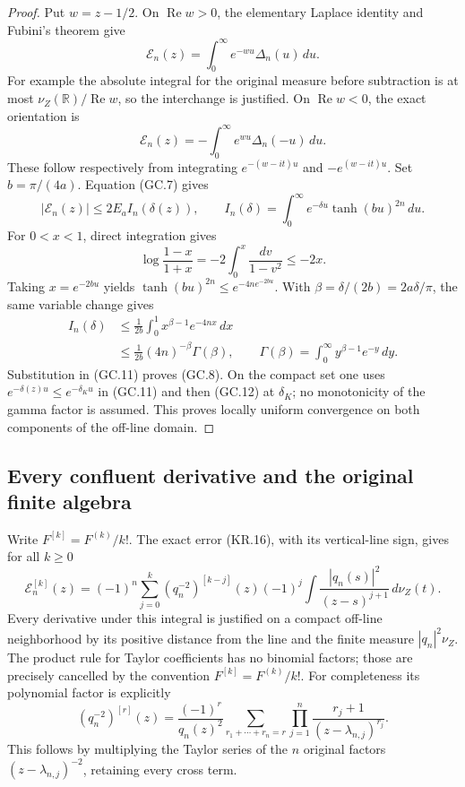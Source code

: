 \begin{proof}
Put \(w=z-1/2\).  On \(\operatorname{Re}w>0\), the elementary
Laplace identity and Fubini's theorem give
\[
 \mathcal E_n(z)=\int_0^\infty e^{-wu}\Delta_n(u)\,du.
                                                        \tag{GC.9}
\]
For example the absolute integral for the original measure before
subtraction is at most \(\nu_Z(\mathbb R)/\operatorname{Re}w\),
so the interchange is justified.  On \(\operatorname{Re}w<0\),
the exact orientation is
\[
 \mathcal E_n(z)=-\int_0^\infty e^{wu}\Delta_n(-u)\,du.
                                                        \tag{GC.10}
\]
These follow respectively from integrating \(e^{-(w-it)u}\) and
\(-e^{(w-it)u}\).  Set \(b=\pi/(4a)\).  Equation (GC.7) gives
\[
 |\mathcal E_n(z)|\leq2E_a I_n(\delta(z)),\qquad
 I_n(\delta)=\int_0^\infty e^{-\delta u}\tanh(bu)^{2n}\,du.
                                                        \tag{GC.11}
\]
For \(0<x<1\), direct integration gives
\[
 \log\frac{1-x}{1+x}=-2\int_0^x\frac{dv}{1-v^2}\leq-2x.
\]
Taking \(x=e^{-2bu}\) yields
\(\tanh(bu)^{2n}\leq e^{-4ne^{-2bu}}\).  With
\(\beta=\delta/(2b)=2a\delta/\pi\), the same variable change gives
\[
 \begin{split}
 I_n(\delta)
 &\leq\frac1{2b}\int_0^1x^{\beta-1}e^{-4nx}\,dx\\
 &\leq\frac1{2b}(4n)^{-\beta}\Gamma(\beta),\qquad
 \Gamma(\beta)=\int_0^\infty y^{\beta-1}e^{-y}\,dy.
 \end{split}                                           \tag{GC.12}
\]
Substitution in (GC.11) proves (GC.8).  On the compact set one
uses \(e^{-\delta(z)u}\leq e^{-\delta_Ku}\) in (GC.11) and
then (GC.12) at \(\delta_K\); no monotonicity of the gamma factor
is assumed.  This proves locally uniform convergence on both
components of the off-line domain.
\end{proof}

\subsection{Every confluent derivative and the original finite algebra}

Write \(F^{[k]}=F^{(k)}/k!\).  The exact error (KR.16), with its
vertical-line sign, gives for all \(k\geq0\)
\[
 \boxed{\displaystyle
 \mathcal E_n^{[k]}(z)=(-1)^n\sum_{j=0}^k
   (q_n^{-2})^{[k-j]}(z)(-1)^j
          \int\frac{|q_n(s)|^2}{(z-s)^{j+1}}\,d\nu_Z(t).}
                                                        \tag{GC.13}
\]
Every derivative under this integral is justified on a compact
off-line neighborhood by its positive distance from the line and
the finite measure \(|q_n|^2\nu_Z\).  The product rule for Taylor
coefficients has no binomial factors; those are precisely cancelled
by the convention \(F^{[k]}=F^{(k)}/k!\).  For completeness its
polynomial factor is explicitly
\[
 (q_n^{-2})^{[r]}(z)=\frac{(-1)^r}{q_n(z)^2}
   \sum_{r_1+\cdots+r_n=r}
        \prod_{j=1}^n\frac{r_j+1}{(z-\lambda_{n,j})^{r_j}}.
                                                        \tag{GC.14}
\]
This follows by multiplying the Taylor series of the \(n\) original
factors \((z-\lambda_{n,j})^{-2}\), retaining every cross term.

